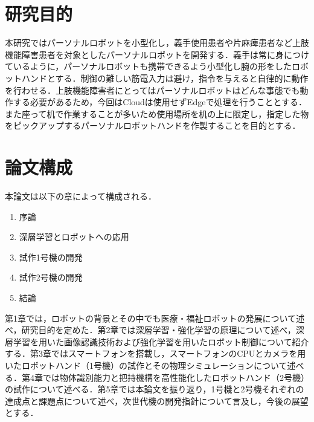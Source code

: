 \section{研究目的}

本研究ではパーソナルロボットを小型化し，義手使用患者や片麻痺患者など上肢機能障害患者を対象としたパーソナルロボットを開発する．義手は常に身につけているように，パーソナルロボットも携帯できるよう小型化し腕の形をしたロボットハンドとする．制御の難しい筋電入力は避け，指令を与えると自律的に動作を行わせる．上肢機能障害者にとってはパーソナルロボットはどんな事態でも動作する必要があるため，今回はCloudは使用せずEdgeで処理を行うこととする．また座って机で作業することが多いため使用場所を机の上に限定し，指定した物をピックアップするパーソナルロボットハンドを作製することを目的とする．

\section{論文構成}
本論文は以下の章によって構成される．
\begin{enumerate}
    \item 序論
    \item 深層学習とロボットへの応用
    \item 試作1号機の開発
    \item 試作2号機の開発
    \item 結論
\end{enumerate}
第1章では，ロボットの背景とその中でも医療・福祉ロボットの発展について述べ，研究目的を定めた．第2章では深層学習・強化学習の原理について述べ，深層学習を用いた画像認識技術および強化学習を用いたロボット制御について紹介する．第3章ではスマートフォンを搭載し，スマートフォンのCPUとカメラを用いたロボットハンド（1号機）の試作とその物理シミュレーションについて述べる．第4章では物体識別能力と把持機構を高性能化したロボットハンド（2号機）の試作について述べる．第5章では本論文を振り返り，1号機と2号機それぞれの達成点と課題点について述べ，次世代機の開発指針について言及し，今後の展望とする．

